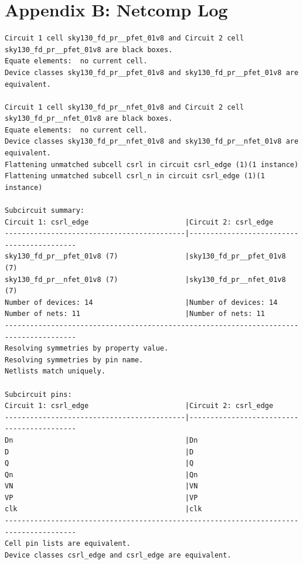 \documentclass[11pt]{article}
\begin{document}
\section*{Appendix B: Netcomp Log}
\begin{lstlisting}
Circuit 1 cell sky130_fd_pr__pfet_01v8 and Circuit 2 cell sky130_fd_pr__pfet_01v8 are black boxes.
Equate elements:  no current cell.
Device classes sky130_fd_pr__pfet_01v8 and sky130_fd_pr__pfet_01v8 are equivalent.

Circuit 1 cell sky130_fd_pr__nfet_01v8 and Circuit 2 cell sky130_fd_pr__nfet_01v8 are black boxes.
Equate elements:  no current cell.
Device classes sky130_fd_pr__nfet_01v8 and sky130_fd_pr__nfet_01v8 are equivalent.
Flattening unmatched subcell csrl in circuit csrl_edge (1)(1 instance)
Flattening unmatched subcell csrl_n in circuit csrl_edge (1)(1 instance)

Subcircuit summary:
Circuit 1: csrl_edge                       |Circuit 2: csrl_edge                       
-------------------------------------------|-------------------------------------------
sky130_fd_pr__pfet_01v8 (7)                |sky130_fd_pr__pfet_01v8 (7)                
sky130_fd_pr__nfet_01v8 (7)                |sky130_fd_pr__nfet_01v8 (7)                
Number of devices: 14                      |Number of devices: 14                      
Number of nets: 11                         |Number of nets: 11                         
---------------------------------------------------------------------------------------
Resolving symmetries by property value.
Resolving symmetries by pin name.
Netlists match uniquely.

Subcircuit pins:
Circuit 1: csrl_edge                       |Circuit 2: csrl_edge                       
-------------------------------------------|-------------------------------------------
Dn                                         |Dn                                         
D                                          |D                                          
Q                                          |Q                                          
Qn                                         |Qn                                         
VN                                         |VN                                         
VP                                         |VP                                         
clk                                        |clk                                        
---------------------------------------------------------------------------------------
Cell pin lists are equivalent.
Device classes csrl_edge and csrl_edge are equivalent.


\end{lstlisting}
\end{document}
